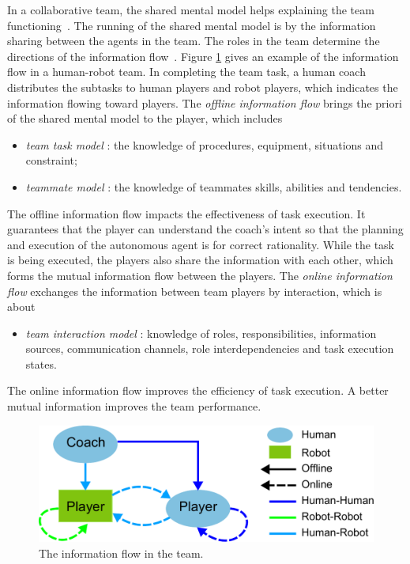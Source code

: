 \documentclass[phd]{byuprop}
\begin{document}
In a collaborative team, the shared mental model helps explaining the team functioning~\cite{Jonker:2010:SMM:2018118.2018128}.
The running of the shared mental model is by the information sharing between the agents in the team.
The roles in the team determine the directions of the information flow~\cite{Yen_implementingshared}.
Figure \ref{fig:team_info_flow} gives an example of the information flow in a human-robot team.
In completing the team task, a human coach distributes the subtasks to human players and robot players, which indicates the information flowing toward players.
The {\em offline information flow} brings the priori of the shared mental model to the player, which includes~\cite{Goodrich2013}
\begin{itemize}
\item {\em team task model} : the knowledge of procedures, equipment, situations and constraint; 
\item {\em teammate model} : the knowledge of teammates skills, abilities and tendencies.
\end{itemize}
The offline information flow impacts the effectiveness of task execution.
It guarantees that the player can understand the coach's intent so that the planning and execution of the autonomous agent is for correct rationality.
While the task is being executed, the players also share the information with each other, which forms the mutual information flow between the players.
The {\em online information flow} exchanges the information between team players by interaction, which is about
\begin{itemize} 
\item {\em team interaction model} : knowledge of roles, responsibilities, information sources, communication channels, role interdependencies and task execution states.
\end{itemize}
The online information flow improves the efficiency of task execution.
A better mutual information improves the team performance.

\begin{figure}[hbtp]
\centering
\includegraphics[width=0.6\linewidth]{./fig/team_info_flow.pdf}
\caption{The information flow in the team.}
\label{fig:team_info_flow}
\end{figure}
\end{document}
